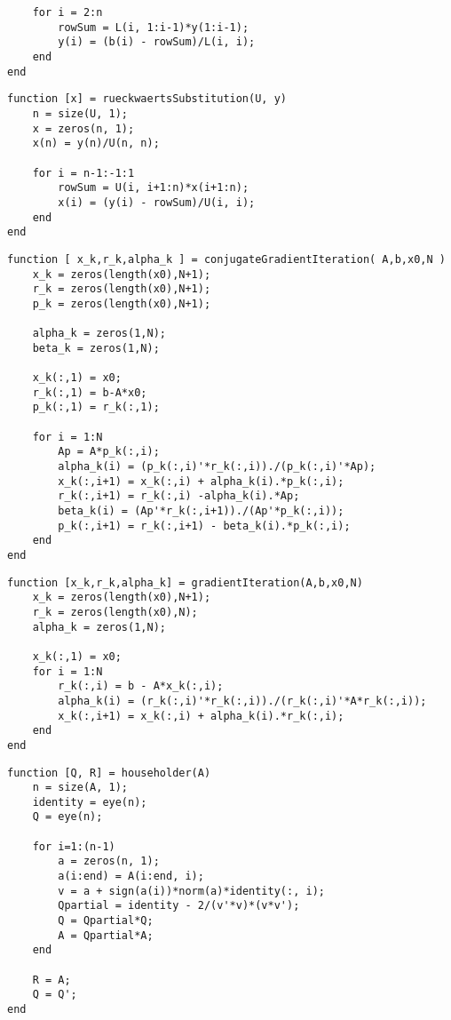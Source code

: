 \documentclass[fs, footer]{latex4ei}
\begin{document}
\begin{multicols*}{4}
\begin{lstlisting}
    for i = 2:n
        rowSum = L(i, 1:i-1)*y(1:i-1);
        y(i) = (b(i) - rowSum)/L(i, i);
    end
end
\end{lstlisting}

\begin{lstlisting}
function [x] = rueckwaertsSubstitution(U, y)
    n = size(U, 1);
    x = zeros(n, 1);
    x(n) = y(n)/U(n, n);

    for i = n-1:-1:1
        rowSum = U(i, i+1:n)*x(i+1:n);
        x(i) = (y(i) - rowSum)/U(i, i);
    end
end
\end{lstlisting}

\begin{lstlisting}
function [ x_k,r_k,alpha_k ] = conjugateGradientIteration( A,b,x0,N )
    x_k = zeros(length(x0),N+1);
    r_k = zeros(length(x0),N+1);
    p_k = zeros(length(x0),N+1);

    alpha_k = zeros(1,N);
    beta_k = zeros(1,N);

    x_k(:,1) = x0;
    r_k(:,1) = b-A*x0;
    p_k(:,1) = r_k(:,1);

    for i = 1:N
        Ap = A*p_k(:,i);
        alpha_k(i) = (p_k(:,i)'*r_k(:,i))./(p_k(:,i)'*Ap);
        x_k(:,i+1) = x_k(:,i) + alpha_k(i).*p_k(:,i);
        r_k(:,i+1) = r_k(:,i) -alpha_k(i).*Ap;
        beta_k(i) = (Ap'*r_k(:,i+1))./(Ap'*p_k(:,i));
        p_k(:,i+1) = r_k(:,i+1) - beta_k(i).*p_k(:,i);
    end
end
\end{lstlisting}

\begin{lstlisting}
function [x_k,r_k,alpha_k] = gradientIteration(A,b,x0,N)
    x_k = zeros(length(x0),N+1);
    r_k = zeros(length(x0),N);
    alpha_k = zeros(1,N);

    x_k(:,1) = x0;
    for i = 1:N
        r_k(:,i) = b - A*x_k(:,i);
        alpha_k(i) = (r_k(:,i)'*r_k(:,i))./(r_k(:,i)'*A*r_k(:,i));
        x_k(:,i+1) = x_k(:,i) + alpha_k(i).*r_k(:,i);
    end
end
\end{lstlisting}

\begin{lstlisting}
function [Q, R] = householder(A)
    n = size(A, 1);
    identity = eye(n);
    Q = eye(n);

    for i=1:(n-1)
        a = zeros(n, 1);
        a(i:end) = A(i:end, i);
        v = a + sign(a(i))*norm(a)*identity(:, i);
        Qpartial = identity - 2/(v'*v)*(v*v');
        Q = Qpartial*Q;
        A = Qpartial*A;
    end

    R = A;
    Q = Q';
end
\end{lstlisting}


\end{multicols*}
\end{document}

